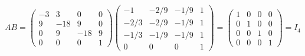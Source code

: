 \documentclass{article}
\begin{document}
\[
AB=\begin{pmatrix}
-3&3&0&0\\
9&-18&9&0\\
0&9&-18&9\\
0&0&0&1
\end{pmatrix}\begin{pmatrix}
-1&-2/9&-1/9&1\\
-2/3&-2/9&-1/9&1\\
-1/3&-1/9&-1/9&1\\
0&0&0&1\end{pmatrix}=\begin{pmatrix}
1&0&0&0\\
0&1&0&0\\
0&0&1&0\\
0&0&0&1
\end{pmatrix}=I_4
\]
\end{document}
